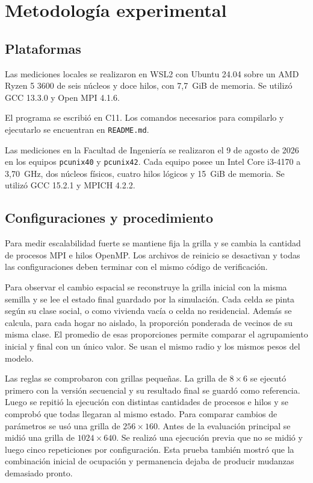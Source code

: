 \section{Metodología experimental}

\subsection{Plataformas}

Las mediciones locales se realizaron en WSL2 con Ubuntu 24.04 sobre un AMD Ryzen 5 3600 de seis núcleos y doce hilos, con 7,7~GiB de memoria. Se utilizó GCC 13.3.0 y Open MPI 4.1.6.

El programa se escribió en C11. Los comandos necesarios para compilarlo y ejecutarlo se encuentran en \texttt{README.md}.

Las mediciones en la Facultad de Ingeniería se realizaron el 9 de agosto de 2026 en los equipos
\texttt{pcunix40} y \texttt{pcunix42}. Cada equipo posee un Intel Core i3-4170
a 3,70~GHz, dos núcleos físicos, cuatro hilos lógicos y 15~GiB de memoria.
Se utilizó GCC 15.2.1 y MPICH 4.2.2.

\subsection{Configuraciones y procedimiento}

Para medir escalabilidad fuerte se mantiene fija la grilla y se cambia la cantidad de procesos MPI e hilos OpenMP. Los archivos de reinicio se desactivan y todas las configuraciones deben terminar con el mismo código de verificación.

Para observar el cambio espacial se reconstruye la grilla inicial con la misma semilla y se lee el estado final guardado por la simulación. Cada celda se pinta según su clase social, o como vivienda vacía o celda no residencial. Además se calcula, para cada hogar no aislado, la proporción ponderada de vecinos de su misma clase. El promedio de esas proporciones permite comparar el agrupamiento inicial y final con un único valor. Se usan el mismo radio y los mismos pesos del modelo.

Las reglas se comprobaron con grillas pequeñas. La grilla de $8\times6$ se ejecutó primero con la versión secuencial y su resultado final se guardó como referencia. Luego se repitió la ejecución con distintas cantidades de procesos e hilos y se comprobó que todas llegaran al mismo estado. Para comparar cambios de parámetros se usó una grilla de $256\times160$. Antes de la evaluación principal se midió una grilla de $1024\times640$. Se realizó una ejecución previa que no se midió y luego cinco repeticiones por configuración. Esta prueba también mostró que la combinación inicial de ocupación y permanencia dejaba de producir mudanzas demasiado pronto.

